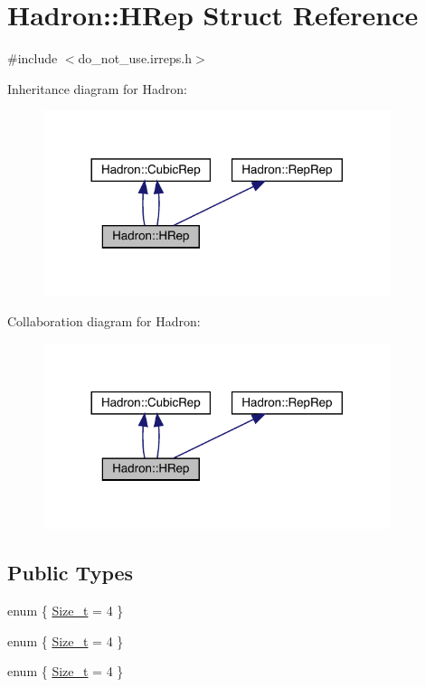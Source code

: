 \hypertarget{structHadron_1_1HRep}{}\section{Hadron\+:\+:H\+Rep Struct Reference}
\label{structHadron_1_1HRep}


{\ttfamily \#include $<$do\+\_\+not\+\_\+use.\+irreps.\+h$>$}



Inheritance diagram for Hadron\+:\nopagebreak
\begin{figure}[H]
\begin{center}
\leavevmode
\includegraphics[width=288pt]{d3/d7f/structHadron_1_1HRep__inherit__graph}
\end{center}
\end{figure}


Collaboration diagram for Hadron\+:\nopagebreak
\begin{figure}[H]
\begin{center}
\leavevmode
\includegraphics[width=288pt]{df/d21/structHadron_1_1HRep__coll__graph}
\end{center}
\end{figure}
\subsection*{Public Types}
\begin{DoxyCompactItemize}
\item 
enum \{ \mbox{\hyperlink{structHadron_1_1HRep_ab340b954bb47c3566f64d67ce55fa96fa075be4602db75ad5eac20da30e4571fd}{Size\+\_\+t}} = 4
 \}
\item 
enum \{ \mbox{\hyperlink{structHadron_1_1HRep_ab340b954bb47c3566f64d67ce55fa96fa075be4602db75ad5eac20da30e4571fd}{Size\+\_\+t}} = 4
 \}
\item 
enum \{ \mbox{\hyperlink{structHadron_1_1HRep_ab340b954bb47c3566f64d67ce55fa96fa075be4602db75ad5eac20da30e4571fd}{Size\+\_\+t}} = 4
 \}
\end{DoxyCompactItemize}
